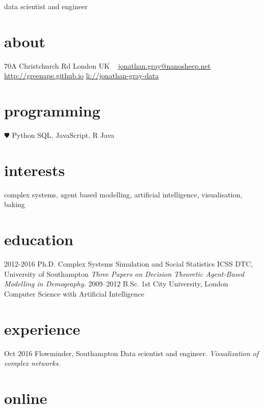 \documentclass[]{friggeri-cv}
\begin{document}
       {data scientist and engineer}

\begin{aside}
  \section{about}
    70A Christchurch Rd
    London
    UK
    ~
    \href{mailto:jonathan.gray@nanosheep.net}{jonathan.gray@nanosheep.net}
    \href{http://greenape.github.io}{http://greenape.github.io}
    \href{http://www.linkedin.com/in/jonathan-gray-data}{li://jonathan-gray-data}
  \section{programming}
    {\color{red} $\varheartsuit$} Python
    SQL, JavaScript, R
    Java
\end{aside}

\section{interests}

complex systems, agent based modelling, artificial intelligence, visualisation, baking 

\section{education}

\begin{entrylist}
  \entry
    {2012-2016}
    {Ph.D. {\normalfont Complex Systems Simulation and Social Statistics}}
    {ICSS DTC, University of Southampton}
    {\emph{Three Papers on Decision Theoretic Agent-Based Modelling in Demography.}}
  \entry
    {2009–2012}
    {B.Sc. 1st}
    {City University, London}
    {Computer Science with Artificial Intelligence}
\end{entrylist}

\section{experience}

\begin{entrylist}
  \entry
    {Oct 2016}
    {Flowminder, Southampton}
    {Data scientist and engineer.}
    {\emph{Visualization of complex networks.}}
\end{entrylist}

\section{online}
\end{document}

